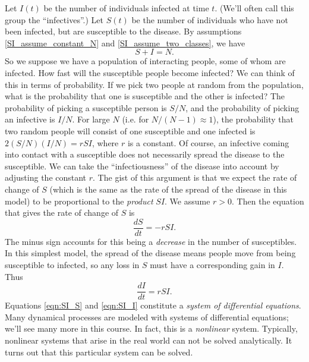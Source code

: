 \documentclass[reqno]{immbook}
\numberwithin{equation}{chapter}
\numberwithin{question}{section}
\numberwithin{theorem}{chapter}
\numberwithin{figure}{chapter}
\theoremstyle{definition}
\begin{document}
Let $I(t)$ be the number of individuals infected at time $t$.
(We'll often call this group the ``infectives''.)
Let $S(t)$ be the number of individuals who have not
been infected, but are susceptible to the disease.
By assumptions \eqref{SI_assume_constant_N} 
and \eqref{SI_assume_two_classes}, we have
\begin{equation}
   S+I = N.
\end{equation}
So we suppose we have a population of interacting people,
some of whom are infected.  How fast will the susceptible
people become infected?  We can think of this in terms
of probability.  If we pick two people at random from
the population, what is the probability that one is
susceptible and the other is infected? The probability
of picking a susceptible person is $S/N$, and the probability
of picking an infective is $I/N$.  For large $N$ (i.e. for
$N/(N-1)\approx 1$), the probability that two random
people will consist of one susceptible and one infected
is $2(S/N)(I/N) = rSI$, where $r$ is a constant.
Of course, an infective coming into contact
with a susceptible does not necessarily spread the disease
to the susceptible.
We can take the ``infectiousness'' of the disease into
account by adjusting the constant $r$.
The gist of this argument is that we expect the rate
of change of $S$ (which is the same as the rate of
the spread of the disease in this model) to be proportional
to the \emph{product} $SI$.
We assume $r>0$.  Then the equation that gives the
rate of change of $S$ is
\begin{equation}
  \frac{dS}{dt} = -r S I.
\label{eqn:SI_S}
\end{equation}
The minus sign accounts for this being a \emph{decrease}
in the number of susceptibles.
In this simplest model, the spread of the disease
means people move from being susceptible to
infected, so any loss in $S$ must have a corresponding
gain in $I$.  Thus
\begin{equation}
  \frac{dI}{dt} = r S I.
\label{eqn:SI_I}
\end{equation}
Equations \eqref{eqn:SI_S} and \eqref{eqn:SI_I}
constitute a \emph{system of differential equations}.
Many dynamical processes are modeled with systems of differential
equations; we'll see many more in this course.
In fact, this is a \emph{nonlinear} system.
Typically, nonlinear systems
that arise in the real world can not be solved analytically.
It turns out that this particular system can be solved.
\end{document}

